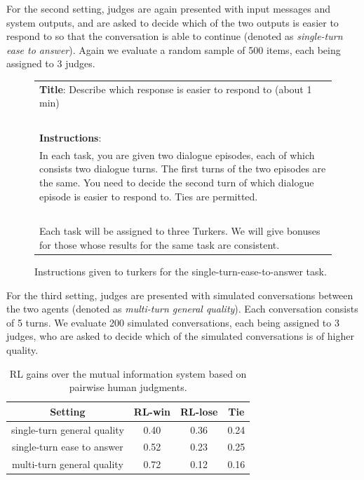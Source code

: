 For the second setting, judges are again presented with input messages and system outputs, and are asked to decide which of the two outputs is easier to respond to so that the conversation is able to continue
(denoted as {\it single-turn ease to answer}).
Again we evaluate a random sample of 500 items, each being assigned to 3 judges. 
\begin{figure}
\begin{tabular}{p{14cm}}\hline
{\bf Title}: Describe which response is easier to respond to (about 1 min)\\
~~\\
{\bf Instructions}:\\
In each task, you are given two dialogue episodes, each of which consists two dialogue turns. The first turns of the two episodes are the same. 
You need to decide the second turn of which dialogue episode is easier to respond to. Ties are permitted. 
~~\\~~\\
Each task will be assigned to three Turkers. 
We will give bonuses for those whose results for the same task are consistent.\\\hline
\end{tabular}
\caption{Instructions given to turkers for the single-turn-ease-to-answer task.}
\label{EasyTurker}
\end{figure}


For the third setting, judges are presented with simulated conversations between the two agents (denoted as {\it multi-turn general quality}). Each conversation consists of 5 turns. 
We evaluate 200 simulated conversations, each being assigned to 3 judges, who are asked to decide which of the simulated conversations is of higher quality.

\begin{table}[!ht]
\centering
\small
\begin{tabular}{cccc} \\\hline
Setting&RL-win&RL-lose&Tie  \\\hline
single-turn general quality&0.40&0.36&0.24 \\
single-turn ease to answer& 0.52&0.23&0.25\\
multi-turn general quality&0.72&0.12&0.16\\\hline
\end{tabular}
\caption{RL gains over the mutual information system based on pairwise human judgments.}
\label{human-eval}
\end{table}

